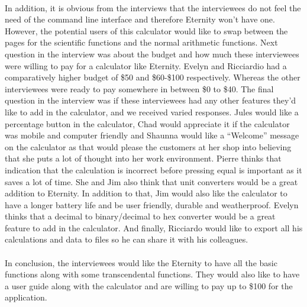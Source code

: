     \paragraph{}
    In addition, it is obvious from the interviews that the interviewees do not feel the need of the command line interface and therefore Eternity won’t have one. However, the potential users of this calculator would like to swap between the pages for the scientific functions and the normal arithmetic functions. Next question in the interview was about the budget and how much these interviewees were willing to pay for a calculator like Eternity. Evelyn and Ricciardio had a comparatively higher budget of \$50 and \$60-\$100 respectively. Whereas the other interviewees were ready to pay somewhere in between \$0 to \$40. The final question in the interview was if these interviewees had any other features they’d like to add in the calculator, and we received varied responses. Jules would like a percentage button in the calculator, Chad would appreciate it if the calculator was mobile and computer friendly and Shaunna would like a “Welcome” message on the calculator as that would please the customers at her shop into believing that she puts a lot of thought into her work environment. Pierre thinks that indication that the calculation is incorrect before pressing equal is important as it saves a lot of time. She and Jim also think that unit converters would be a great addition to Eternity. In addition to that, Jim would also like the calculator to have a longer battery life and be user friendly, durable and weatherproof. Evelyn thinks that a decimal to binary/decimal to hex converter would be a great feature to add in the calculator. And finally, Ricciardo would like to export all his calculations and data to files so he can share it with his colleagues.

    \paragraph{}
    In conclusion, the interviewees would like the Eternity to have all the basic functions along with some transcendental functions. They would also like to have a user guide along with the calculator and are willing to pay up to \$100 for the application.

